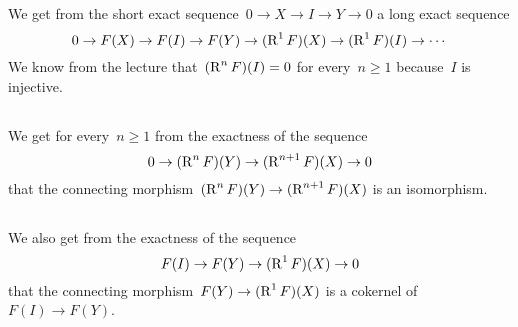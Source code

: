 \section{}

We get from the short exact sequence~$0 \to X \to I \to Y \to 0$ a long exact sequence
\[
  0
  \to
  F(X)
  \to
  F(I)
  \to
  F(Y)
  \to
  (\operatorname{R}^1 F)(X)
  \to
  (\operatorname{R}^1 F)(I)
  \to
  \dotsb
\]
We know from the lecture that~$(\operatorname{R}^n F)(I) = 0$ for every~$n \geq 1$ because~$I$ is injective.





\subsection{}

We get for every~$n \geq 1$ from the exactness of the sequence
\[
  0
  \to
  (\operatorname{R}^n F)(Y)
  \to
  (\operatorname{R}^{n+1} F)(X)
  \to
  0
\]
that the connecting morphism~$(\operatorname{R}^n F)(Y) \to (\operatorname{R}^{n+1} F)(X)$ is an isomorphism.





\subsection{}

We also get from the exactness of the sequence
\[
  F(I)
  \to
  F(Y)
  \to
  (\operatorname{R}^1 F)(X)
  \to
  0
\]
that the connecting morphism~$F(Y) \to (\operatorname{R}^1 F)(X)$ is a cokernel of~$F(I) \to F(Y)$.





